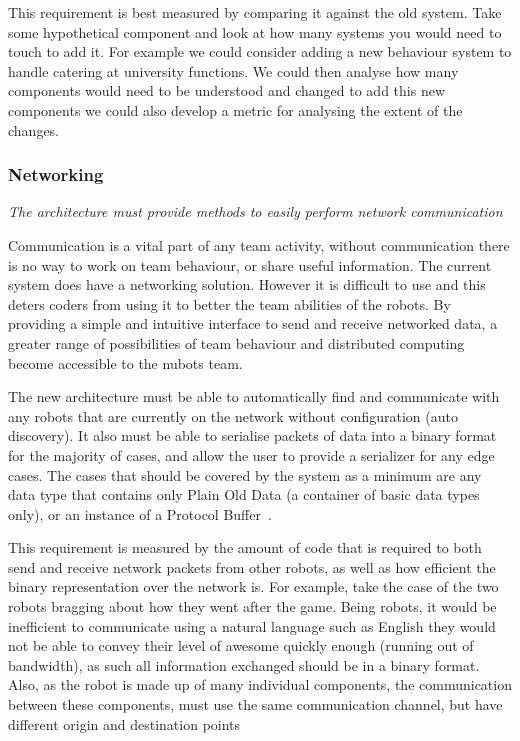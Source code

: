 \documentclass[english,12pt]{scrartcl}
\newcommand{\requirement}[1]{\textit{#1}}
\begin{document}
				This requirement is best measured by comparing it against the old system. Take some
				hypothetical component and look at how many systems you would need to touch to add it.
				For example we could consider adding a new behaviour system to handle catering at
				university functions. We could then analyse how many components would need to be
				understood and changed to add this new components we could also develop a metric for
				analysing the extent of the changes.

			\subsubsection{Networking}
				\requirement{The architecture must provide methods to easily perform network
				communication}
	
				Communication is a vital part of any team activity, without communication there is no
				way to work on team behaviour, or share useful information. The current system does have
				a networking solution. However it is difficult to use and this deters coders from using
				it to better the team abilities of the robots. By providing a simple and intuitive
				interface to send and receive networked data, a greater range of possibilities of team
				behaviour and distributed computing become accessible to the \gls{nubots} team.
	
				The new architecture must be able to automatically find and communicate with any robots
				that are currently on the network without configuration (auto discovery). It also must
				be able to serialise packets of data into a binary format for the majority of cases, and
				allow the user to provide a serializer for any edge cases. The cases that should be
				covered by the system as a minimum are any data type that contains only Plain Old Data
				(a container of basic data types only), or an instance of a
				Protocol Buffer~\cite{protobuf}.
	
				This requirement is measured by the amount of code that is required to both send and
				receive network packets from other robots, as well as how efficient the binary
				representation over the network is. For example, take the case of the two robots
				bragging about how they went after the game. Being robots, it would be inefficient to
				communicate using a natural language such as English they would not be able to convey
				their level of awesome quickly enough (running out of bandwidth), as such all
				information exchanged should be in a binary format. Also, as the robot is made up of
				many individual components, the communication between these components, must use the
				same communication channel, but have different origin and destination points
\end{document}
